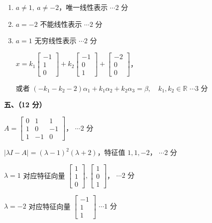 \documentclass[a4paper,11pt]{ctexart}
\newcommand{\score}[1]{\hfill$\cdots\text{#1 分}$}
\begin{document}
\begin{enumerate}[label=(\arabic*), leftmargin=2.4em, itemsep=0.35em, topsep=0.3em]
  \item $a \neq 1,\ a \neq -2$，唯一线性表示 \score{2}
  \item $a = -2$ 不能线性表示 \score{2}
  \item $a = 1$ 无穷线性表示 \score{2}

  $x = k_1\begin{bmatrix} -1 \\ 1 \\ 0 \end{bmatrix} + k_2\begin{bmatrix} -1 \\ 0 \\ 1 \end{bmatrix} + \begin{bmatrix} -2 \\ 0 \\ 0 \end{bmatrix}$，

  或者 $(-k_1 - k_2 - 2)\alpha_1 + k_1\alpha_2 + k_2\alpha_3 = \beta,\quad k_1, k_2 \in \mathbb{R}$ \score{3}
\end{enumerate}

\vspace{0.9em}

\textbf{五、（12 分）}

$A = \begin{bmatrix} 0 & 1 & 1 \\ 1 & 0 & -1 \\ 1 & -1 & 0 \end{bmatrix}$， \score{2}

$|\lambda I - A| = (\lambda - 1)^2(\lambda + 2)$，特征值 $1, 1, -2$， \score{2}

$\lambda = 1$ 对应特征向量 $\begin{bmatrix} 1 \\ 1 \\ 0 \end{bmatrix}, \begin{bmatrix} 1 \\ 0 \\ 1 \end{bmatrix}$， \score{2}

$\lambda = -2$ 对应特征向量 $\begin{bmatrix} -1 \\ 1 \\ 1 \end{bmatrix}$ \score{1}
\end{document}
